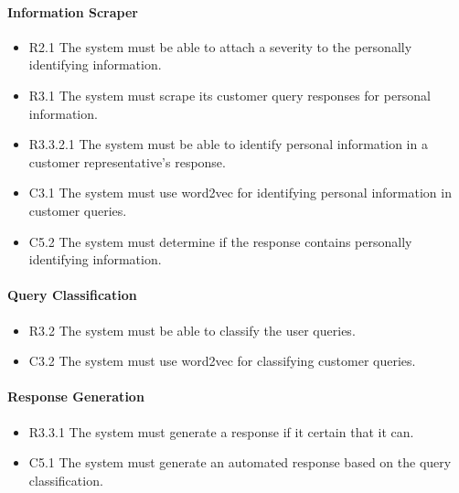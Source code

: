 \documentclass[11pt]{article}
\begin{document}
\paragraph{Information Scraper}
\begin{itemize}
  \item[] R2.1 The system must be able to attach a severity to the personally identifying information.
  \item[] R3.1 The system must scrape its customer query responses for personal information.
  \item[] R3.3.2.1 The system must be able to identify personal information in a customer representative's response. 
  \item[] C3.1 The system must use word2vec for identifying personal information in customer queries.
  \item[] C5.2 The system must determine if the response contains personally identifying information.
\end{itemize}

\paragraph{Query Classification}
\begin{itemize}
  \item[] R3.2 The system must be able to classify the user queries.
  \item[] C3.2 The system must use word2vec for classifying customer queries.
\end{itemize}

\paragraph{Response Generation}
\begin{itemize}
  \item[] R3.3.1 The system must generate a response if it certain that it can.
  \item[] C5.1 The system must generate an automated response based on the query classification.
\end{itemize}
\end{document}
